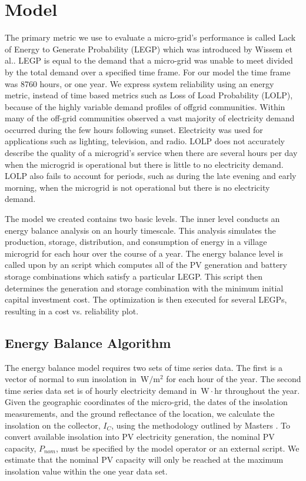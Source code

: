 \documentclass{article}
\newcommand{\unit}[1]{\ensuremath{\, \mathrm{#1}}}
\begin{document}
\section{Model}
The primary metric we use to evaluate a micro-grid's performance is called Lack of Energy to Generate Probability (LEGP) which was introduced by Wissem et al.\cite{}.
LEGP is equal to the demand that a micro-grid was unable to meet divided by the total demand over a specified time frame. 
For our model the time frame was 8760 hours, or one year. 
We express system reliability using an energy metric, instead of time based metrics such as Loss of Load Probability (LOLP), because of the highly variable demand profiles of offgrid communities. 
Within many of the off-grid communities observed a vast majority of electricity demand occurred during the few hours following sunset.
Electricity was used for applications such as lighting, television, and radio. 
LOLP does not accurately describe the quality of a microgrid's service when there are several hours per day when the microgrid is operational but there is little to no electricity demand. 
LOLP also fails to account for periods, such as during the late evening and early morning, when the microgrid is not operational but there is no electricity demand.

The model we created contains two basic levels.
The inner level conducts an energy balance analysis on an hourly timescale.
This analysis simulates the production, storage, distribution, and consumption of energy in a village microgrid for each hour over the course of a year. 
The energy balance level is called upon by an script which computes all of the PV generation and battery storage combinations which satisfy a particular LEGP. 
This script then determines the generation and storage combination with the minimum initial capital investment cost. 
The optimization is then executed for several LEGPs, resulting in a cost vs. reliability plot.

\subsection{Energy Balance Algorithm}

The energy balance model requires two sets of time series data. 
The first is a vector of normal to sun insolation in \unit{W/m^2} for each hour of the year.
The second time series data set is of hourly electricity demand in \unit{W\cdot hr} throughout the year. 
Given the geographic coordinates of the micro-grid, the dates of the insolation measurements, and the ground reflectance of the location, we calculate the insolation on the collector, $I_C$, using the methodology outlined by Masters \cite{}. 
To convert available insolation into PV electricity generation, the nominal PV capacity, $P_{nom}$, must be specified by the model operator or an external script.
We estimate that the nominal PV capacity will only be reached at the maximum insolation value within the one year data set.
\end{document}
